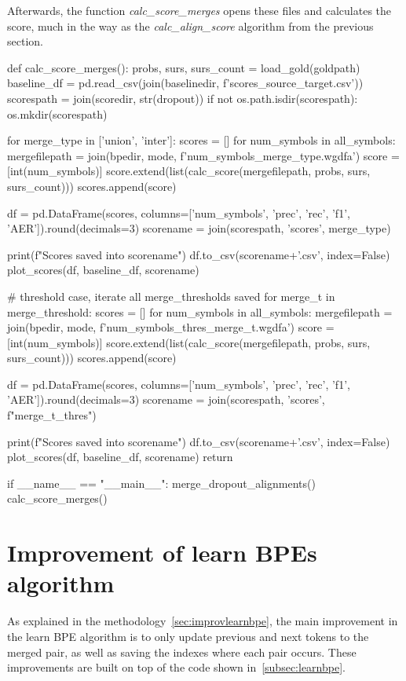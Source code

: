 Afterwards, the function \emph{calc\_score\_merges} opens these files and calculates the score, much in the way as the \emph{calc\_align\_score} algorithm from the previous section.

\begin{python}
def calc_score_merges():
  probs, surs, surs_count = load_gold(goldpath)
  baseline_df = pd.read_csv(join(baselinedir, f'scores_{source}_{target}.csv'))
  scorespath = join(scoredir, str(dropout))
  if not os.path.isdir(scorespath):
    os.mkdir(scorespath)

  for merge_type in ['union', 'inter']:
    scores = []
    for num_symbols in all_symbols:
      mergefilepath = join(bpedir, mode, f'{num_symbols}_{merge_type}.wgdfa')
      score = [int(num_symbols)]
      score.extend(list(calc_score(mergefilepath, probs, surs, surs_count)))
      scores.append(score)

    df = pd.DataFrame(scores, columns=['num_symbols', 'prec', 'rec', 'f1', 'AER']).round(decimals=3)
    scorename = join(scorespath, 'scores', merge_type)

    print(f"Scores saved into {scorename}")
    df.to_csv(scorename+'.csv', index=False)
    plot_scores(df, baseline_df, scorename)

  # threshold case, iterate all merge_thresholds saved
  for merge_t in merge_threshold:
    scores = []
    for num_symbols in all_symbols:
      mergefilepath = join(bpedir, mode, f'{num_symbols}_thres_{merge_t}.wgdfa')
      score = [int(num_symbols)]
      score.extend(list(calc_score(mergefilepath, probs, surs, surs_count)))
      scores.append(score)

    df = pd.DataFrame(scores, columns=['num_symbols', 'prec', 'rec', 'f1', 'AER']).round(decimals=3)
    scorename = join(scorespath, 'scores', f"{merge_t}_thres")
    
    print(f"Scores saved into {scorename}")
    df.to_csv(scorename+'.csv', index=False)
    plot_scores(df, baseline_df, scorename)
  return

if __name__ == "__main__":
    merge_dropout_alignments()
    calc_score_merges()
\end{python}

\section{Improvement of learn BPEs algorithm}\label{dev:improvbpe}

As explained in the methodology~\ref{sec:improvlearnbpe}, the main improvement in the learn BPE algorithm is to only update previous and next tokens to the merged pair, as well as saving the indexes where each pair occurs. These improvements are built on top of the code shown in~\ref{subsec:learnbpe}. 

